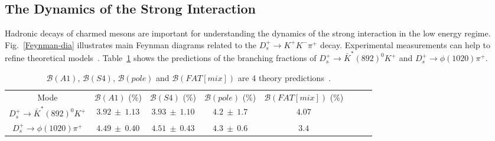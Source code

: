 \subsection{The Dynamics of the Strong Interaction}
\par{
    Hadronic decays of charmed mesons are important for understanding the dynamics of the strong interaction in the low energy regime.
    Fig.~\ref{Feynman-dia} illustrates main Feynman diagrams related to the $D_{s}^{+} \rightarrow K^{+}K^{-}\pi^{+}$ decay.
    Experimental measurements can help to refine theoretical models~\cite{PRD93-114010}.
    Table~\ref{theory-pre} shows the predictions of the branching fractions of $D_{s}^{+} \rightarrow \bar{K}^{*}(892)^{0}K^{+}$ and $D_{s}^{+} \rightarrow \phi(1020)\pi^{+}$.
    \begin{table}[htbp]
        \caption{
            $\mathcal{B}(A1)$, $\mathcal{B}(S4)$, $\mathcal{B}(pole)$ and $\mathcal{B}(FAT[mix])$ are 4 theory predictions~\cite{PRD93-114010}. 
        }
        \label{theory-pre}
        \begin{center}
            \begin{tabular}{cccccccc}
                \toprule\toprule
                Mode &  $\mathcal{B}(A1)$ (\%)& $\mathcal{B}(S4)$ (\%)&  $\mathcal{B}(pole)$ (\%)&$\mathcal{B}(FAT[mix])$ (\%)&\\
                $D_{s}^{+} \rightarrow \bar{K}^{*}(892)^{0}K^{+}$           & $3.92\ \pm\ 1.13$  & $3.93\ \pm\ 1.10$  & $4.2\ \pm\ 1.7$  & $4.07$  \\
                $D_{s}^{+} \rightarrow \phi(1020)\pi^{+}$                   & $4.49\ \pm\ 0.40$  & $4.51\ \pm\ 0.43$  & $4.3\ \pm\ 0.6$  & $3.4$  \\

\end{tabular}
\end{center}
\end{table}}
